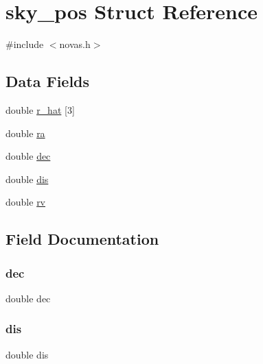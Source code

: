 \hypertarget{structsky__pos}{}\section{sky\+\_\+pos Struct Reference}
\label{structsky__pos}


{\ttfamily \#include $<$novas.\+h$>$}

\subsection*{Data Fields}
\begin{DoxyCompactItemize}
\item 
double \mbox{\hyperlink{structsky__pos_a5fd669be4d5224aa192afa368a6e3173}{r\+\_\+hat}} \mbox{[}3\mbox{]}
\item 
double \mbox{\hyperlink{structsky__pos_a713a0c71a86d92fa6892fdb2cb7c9422}{ra}}
\item 
double \mbox{\hyperlink{structsky__pos_ac4ae7989694321b540abb75c30eec690}{dec}}
\item 
double \mbox{\hyperlink{structsky__pos_aeedff25e8c80502a891e8af33d35b3c0}{dis}}
\item 
double \mbox{\hyperlink{structsky__pos_ad9e8b5daff39072d109a6f4f1fa61f55}{rv}}
\end{DoxyCompactItemize}


\subsection{Field Documentation}
\mbox{\label{structsky__pos_ac4ae7989694321b540abb75c30eec690}} 
\subsubsection{\texorpdfstring{dec}{dec}}
{\footnotesize\ttfamily double dec}

\mbox{\label{structsky__pos_aeedff25e8c80502a891e8af33d35b3c0}} 
\subsubsection{\texorpdfstring{dis}{dis}}
{\footnotesize\ttfamily double dis}

